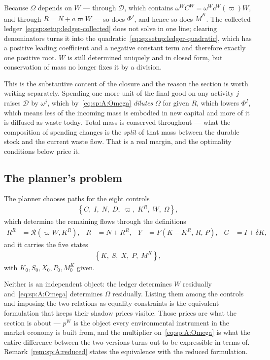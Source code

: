  Because $\Omega$ depends on $W$ --- through
$\mathcal D$, which contains $\omega^WC^W=\omega^Wc^W\left(\varpi\right)W$, and through $R=N+a\varpi W$
--- so does $\Phi^I$, and hence so does $\dot M^K$. The collected
ledger~\eqref{eq:sp:setup:ledger-collected} does not solve in one line; clearing denominators turns it
into the quadratic~\eqref{eq:sp:setup:ledger-quadratic}, which has a positive leading coefficient and a
negative constant term and therefore exactly one positive root. $W$ is still determined uniquely and
in closed form, but conservation of mass no longer fixes it by a division.

 This is the substantive
content of the closure and the reason the section is worth writing separately. Spending one more unit
of the final good on any activity $j$ raises $\mathcal D$ by $\omega^j$, which
by~\eqref{eq:sp:A:Omega} \emph{dilutes} $\Omega$ for given $R$, which lowers $\Phi^I$, which means
less of the incoming mass is embodied in new capital and more of it is diffused as waste today.
Total mass is conserved throughout --- what the composition of spending changes is the \emph{split}
of that mass between the durable stock and the current waste flow. That is a real margin, and the
optimality conditions below price it.


\subsection{The planner's problem}\label{sec:sp:A:problem}

 The planner chooses paths for the eight controls
\begin{align}
\left\{C,\;I,\;N,\;D,\;\varpi,\;K^R,\;W,\;\Omega\right\},
\label{eq:sp:A:controls}
\end{align}
which determine the remaining flows through the definitions
\begin{align}
R^R &= \mathcal R\left(\varpi W,K^R\right),
&
R &= N+R^R,
&
Y &= F\left(K-K^R,\,R,\,P\right),
&
G &= I+\delta K,
\label{eq:sp:A:definitions}
\end{align}
and it carries the five states
\begin{align}
\left\{K,\;S,\;X,\;P,\;M^K\right\},
\label{eq:sp:A:states}
\end{align}
with $K_0,S_0,X_0,P_0,M^K_0$ given.

 Neither is an independent object: the
ledger determines $W$ residually and~\eqref{eq:sp:A:Omega} determines $\Omega$ residually. Listing
them among the controls and imposing the two relations as equality constraints is the equivalent
formulation that keeps their shadow prices visible. Those prices are what the section is about ---
$p^W$ is the object every environmental instrument in the market economy is built from, and the
multiplier on~\eqref{eq:sp:A:Omega} is what the entire difference between the two versions turns out
to be expressible in terms of. Remark~\ref{rem:sp:A:reduced} states the equivalence with the reduced
formulation.

